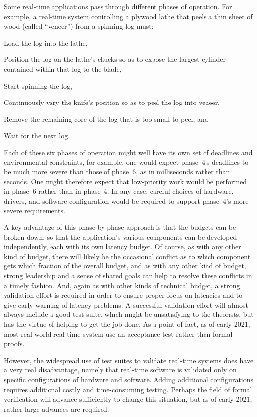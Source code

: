 Some real-time applications pass through different phases of operation.
For example, a real-time system controlling a plywood lathe that peels
a thin sheet of wood (called ``veneer'') from a spinning log must:
\begin{enumerate*}[(1)]
\item Load the log into the lathe,
\item Position the log on the lathe's chucks so as to expose the largest
cylinder contained within that log to the blade,
\item Start spinning the log,
\item Continuously vary the knife's position so as to peel the log into veneer,
\item Remove the remaining core of the log that is too small to peel, and
\item Wait for the next log.
\end{enumerate*}
Each of these six phases of operation might well have its own set of
deadlines and environmental constraints,
for example, one would expect phase~4's deadlines to be much more severe
than those of phase~6, as in milliseconds rather than seconds.
One might therefore expect that low-priority work would be performed in
phase~6 rather than in phase~4.
In any case, careful choices of hardware, drivers, and software
configuration would be required to support phase~4's more severe
requirements.

A key advantage of this phase-by-phase approach is that the 
budgets can be broken down, so that the application's various components
can be developed independently, each with its own latency budget.
Of course, as with any other kind of budget, there will likely be the
occasional conflict as to which component gets which fraction of the
overall budget, and as with any other kind of budget, strong leadership
and a sense of shared goals can help to resolve these conflicts in
a timely fashion.
And, again as with other kinds of technical budget, a strong validation
effort is required in order to ensure proper focus on latencies and to
give early warning of latency problems.
A successful validation effort will almost always include a good test
suite, which might be unsatisfying to the theorists, but has the virtue
of helping to get the job done.
As a point of fact, as of early 2021, most real-world real-time system
use an acceptance test rather than formal proofs.

However, the widespread use of test suites to validate real-time systems
does have a very real disadvantage, namely that real-time software is
validated only on specific configurations of hardware and software.
Adding additional configurations requires additional costly and
time-consuming testing.
Perhaps the field of formal verification will advance sufficiently to
change this situation, but as of early 2021, rather
large advances are required.


